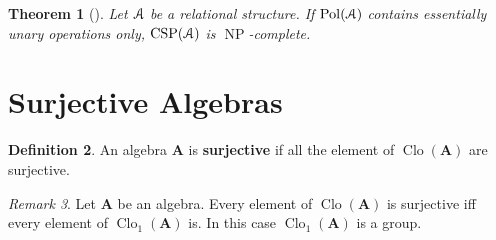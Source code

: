 \documentclass{amsart}
\theoremstyle{plain}
\newtheorem{theorem}{Theorem}[section]
\theoremstyle{definition}
\newtheorem{definition}[theorem]{Definition}
\theoremstyle{remark}
\newtheorem{remark}[theorem]{Remark}
\DeclareMathOperator{\Clo}{Clo}
\DeclareMathOperator{\CSP}{CSP}
\DeclareMathOperator{\Pol}{Pol}
\DeclareMathOperator{\NP}{NP}
\begin{document}
\begin{theorem}[\cite{jeavons}]
    Let $\EuScript{A}$ be a relational structure. 
    If $\Pol(\EuScript{A})$ contains essentially unary operations only, $\CSP(\EuScript{A})$ is $\NP$-complete. 
\end{theorem}

\section{Surjective Algebras}

\begin{definition}
    An algebra $\mathbf{A}$ is \textbf{surjective} if all the element of $\Clo(\mathbf{A})$ are surjective. 
\end{definition}

\begin{remark}
    \label{surj_group}
    Let $\mathbf{A}$ be an algebra. 
    Every element of $\Clo(\mathbf{A})$ is surjective iff every element of $\Clo_1(\mathbf{A})$ is. 
    In this case $\Clo_1(\mathbf{A})$ is a group. 
\end{remark}
\end{document}
